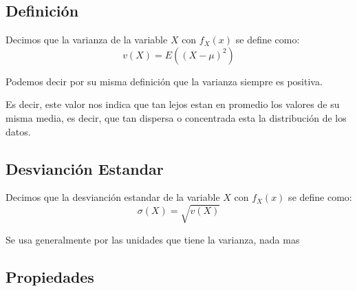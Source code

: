 \documentclass[12pt, fleqn]{report}                             %
\theoremstyle{break}                                            %
\begin{document}
            \subsection{Definición}

                Decimos que la varianza de la variable $X$
                con $f_{X}(x)$ se define como:
                \begin{equation*}
                    v(X) = E((X - \mu)^2)
                \end{equation*}

                Podemos decir por su misma definición que la varianza siempre es positiva.

                Es decir, este valor nos indica que tan lejos estan en promedio los valores de
                su misma media, es decir, que tan dispersa o concentrada esta la distribución de 
                los datos.

            \vspace{1em}
            \subsection{Desvianción Estandar}

                Decimos que la desvianción estandar de la variable $X$
                con $f_{X}(x)$ se define como:
                \begin{equation*}
                    \sigma(X) = \sqrt{v(X)}
                \end{equation*}

                Se usa generalmente por las unidades que tiene la varianza, nada mas


            \clearpage
            \subsection{Propiedades}
\end{document}
